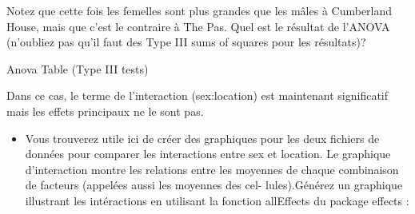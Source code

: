 \documentclass[12pt,]{book}
\newenvironment{Shaded}{\begin{snugshade}}{\end{snugshade}}
\newcommand{\DataTypeTok}[1]{\textcolor[rgb]{0.27,0.27,0.27}{#1}}
\newcommand{\DecValTok}[1]{\textcolor[rgb]{0.06,0.06,0.06}{#1}}
\newcommand{\KeywordTok}[1]{\textcolor[rgb]{0.27,0.27,0.27}{\textbf{#1}}}
\newcommand{\NormalTok}[1]{#1}
\newcommand{\OperatorTok}[1]{\textcolor[rgb]{0.43,0.43,0.43}{\textbf{#1}}}
\newcommand{\StringTok}[1]{\textcolor[rgb]{0.5,0.5,0.5}{#1}}
\providecommand{\tightlist}{%
  \setlength{\itemsep}{0pt}\setlength{\parskip}{0pt}}
\begin{document}

Notez que cette fois les femelles sont plus grandes que les mâles à Cumberland House, mais que c'est le contraire à The Pas. Quel est le résultat de l'ANOVA (n'oubliez pas qu'il faut des Type III sums of squares pour les résultats)?

Anova Table (Type III tests)

Dans ce cas, le terme de l'interaction (sex:location) est maintenant significatif mais les effets principaux ne le sont pas.

\begin{itemize}
\tightlist
\item
  Vous trouverez utile ici de créer des graphiques pour les deux fichiers de données pour comparer les interactions entre sex et location. Le graphique d'interaction montre les relations entre les moyennes de chaque combinaison de facteurs (appelées aussi les moyennes des cel- lules).Générez un graphique illustrant les intéractions en utilisant la fonction allEffects du package effects :
\end{itemize}
\end{document}
